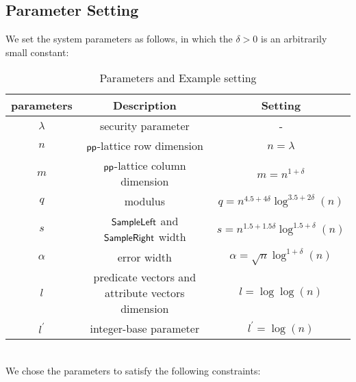 \subsection{Parameter Setting}
We set the system parameters as follows, in which the $\delta>0$ is an arbitrarily small constant:
\begin{table}[htbp]
\centering
\begin{tabular}{|c|c|c|}
\hline parameters & Description & Setting\\
\hline $\lambda$ & security parameter & -\\
\hline $n$ & $\mathsf{pp}$-lattice row dimension & $n=\lambda$\\
\hline $m$ & $\mathsf{pp}$-lattice column dimension & $m=n^{1+\delta}$\\
\hline $q$ & modulus & $q=n^{4.5+4\delta}\log^{3.5+2\delta}(n)$\\
\hline $s$ & $\mathsf{SampleLeft}$ and $\mathsf{SampleRight}$ width & $s=n^{1.5+1.5\delta}\log^{1.5+\delta}(n)$\\
\hline $\alpha$ & error width & $\alpha=\sqrt{n}\log^{1+\delta}(n)$\\
\hline $l$ & predicate vectors and attribute vectors dimension & $l=\log\log(n)$\\
\hline $l^{'}$ & integer-base parameter & $l^{'}=\log(n)$\\
\hline
\end{tabular}
\caption{Parameters and Example setting}
\end{table}\\[0.4cm]
We chose the parameters to satisfy the following constraints:
